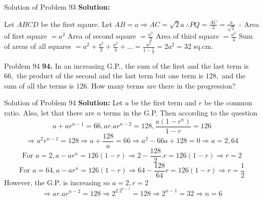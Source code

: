 \documentclass[aspectratio=1610,8pt]{beamer}
\begin{document}
\begin{frame}{Solution of Problem 93}
  \textbf{Solution:}
  \begin{center}
  \end{center}
  Let $ABCD$ be the first sqaure. Let $AB = a \Rightarrow AC = \sqrt{2}a~\therefore PQ = \frac{AC}{2} = \frac{a}{\sqrt{2}}$
  \linebreak\linebreak
  $\therefore $ Area of first square $= a^2$
  \linebreak\linebreak
  Area of second sqaure $= \frac{a^2}{2}$
  \linebreak\linebreak
  Area of third square $= \frac{a^2}{4}$
  \linebreak\linebreak
  Sum of areas of all squares $= a^2 + \frac{a^2}{2} + \frac{a^2}{4} + \ldots = \frac{a^2}{1 - \frac{1}{2}} = 2a^2 = 32$ sq.cm.
\end{frame}
\begin{frame}{Problem 94}
  \textbf{94.} In an increasing G.P., the sum of the first and the last term is $66,$ the product of the second and the last term
  but one term is $128,$ and the sum of all the terms is $126.$ How many terms are there in the progression?
\end{frame}
\begin{frame}{Solution of Problem 94}
  \textbf{Solution:} Let $a$ be the first term and $r$ be the common ratio. Also, let that there are $n$ terms in the G.P. Then
  according to the question
  $$a + ar^{n - 1} = 66, ar.ar^{n - 2} = 128, \frac{a(1 - r^n)}{1 - r} = 126$$
  $$\Rightarrow a^2r^{n - 1} = 128 \Rightarrow a + \frac{128}{a} = 66 \Rightarrow a^2 - 66a + 128 = 0 \Rightarrow a = 2, 64$$
  $$\text{For~} a = 2, a - ar^n = 126(1 - r)\Rightarrow 2 - \frac{128}{2}.r = 126(1 - r) \Rightarrow r = 2$$
  $$\text{For~} a = 64, a - ar^n = 126(1 - r) \Rightarrow 64 - \frac{128}{64}r = 126(1 - r) \Rightarrow r = \frac{1}{2}$$
  However, the G.P. is increasing so $a = 2, r = 2$
  $$\Rightarrow ar.ar^{n - 2} = 128 \Rightarrow 2^2.2^{n - 1} = 128 \Rightarrow 2^{n - 1} = 32 \Rightarrow n = 6$$
\end{frame}
\end{document}
